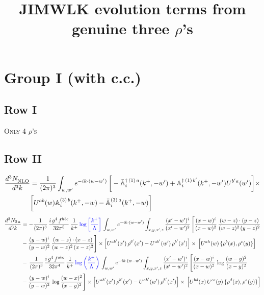 \documentclass[9pt]{article}
\title{JIMWLK evolution terms from genuine three $\rho$'s}
\author{}
\date{}
\def\mf#1{\mathbb{#1}}
\numberwithin{equation}{section}
\begin{document}
\maketitle 
\section{Group I (with c.c.)}
\subsection{Row I}
\textsc{Only 4 $\rho$'s}
\subsection{Row II}
\begin{align}
    \frac{d^{3}N_{\rm NLO}^{\rm}}{d^{3}k} &  = \frac{1}{(2\pi)^{3}}  \int_{w, w^\prime} e^{-ik\cdot (w-w')}\,\bigg[-\bar{\mf{A}}^{\dagger\,(1)\,a}_{i}(k^{+},-w^{\prime})+\mf{A}^{\dagger\, (1)\, b^{\prime}}_{i}(k^{+},-w^{\prime})U^{b^{\prime}a}(w^{\prime})\bigg]\times \notag \\ & \bigg[U^{ab}(w)\mf{A}^{(3)\, b}_{i}(k^{+},- w)-\Bar{\mf{A}}^{(3)\, a}_{i}(k^{+}, - w)\bigg]\nonumber
\end{align}
\begin{align}
    \frac{d^{3}N_{2\,a}}{d^{3}k} & = -\frac{1}{(2\pi)^{3}}\,\frac{i\,g^{4}\,f^{hbc}}{32\pi^{5}}\,\frac{1}{k^{+}}\,{\color{blue}\log{\left[\frac{k^{+}}{\Lambda}\right]}}\,
\int_{w,w'} e^{-ik\cdot (w-w')}\int_{x,y,x',z}\frac{(x'-w')^{i}}{(x'-w')^{2}}\,\Bigg[\frac{(x-w)^{i}}{(x-w)^{2}}\, \frac{(w-z)\cdot (y-z)}{(w-z)^{2}\,(y-z)^{2}}\notag \\ & - \frac{(y-w)^{i}}{(y-w)^{2}}\, \frac{(w-z)\cdot (x-z)}{(w-z)^{2}\,(x-z)^{2}}\Bigg]\times\Big[U^{ab'}(x')\,\rho^{b'}(x')-U^{ab'}(w')\,\rho^{b'}(x')\Big]\times\, \Big[U^{ah}(w)\,\{\rho^{b}(x),\rho^{c}(y)\}\Big]\notag \\ &  -\,\frac{1}{(2\pi)^{3}}\,\frac{i\,g^{4}\,f^{abc}}{32\pi^{4}}\,\frac{1}{k^{+}}\,{\color{blue}\log\left(\frac{k^{+}}{\Lambda}\right)}\,
\int_{w,w'} e^{-ik\cdot (w-w')}\int_{x,y,x',z}\frac{(x'-w')^{i}}{(x'-w')^{2}}\,\Bigg[\frac{(x-w)^{i}}{(x-w)^{2}}\,\log\frac{(w-y)^{2}}{(x-y)^{2}}\notag \\ & -\frac{(y-w)^{i}}{(y-w)^{2}}\,\log\frac{(w-x)^{2}}{(x-y)^{2}}\Bigg]\times \Big[U^{ab'}(x')\,\rho^{b'}(x')-U^{ab'}(w')\,\rho^{b'}(x')\Big]\times\, \Big[U^{bd}(x)\,U^{ce}(y)\,\{\rho^{d}(x),\rho^{e}(y)\}\Big]
\end{align}
\end{document}
